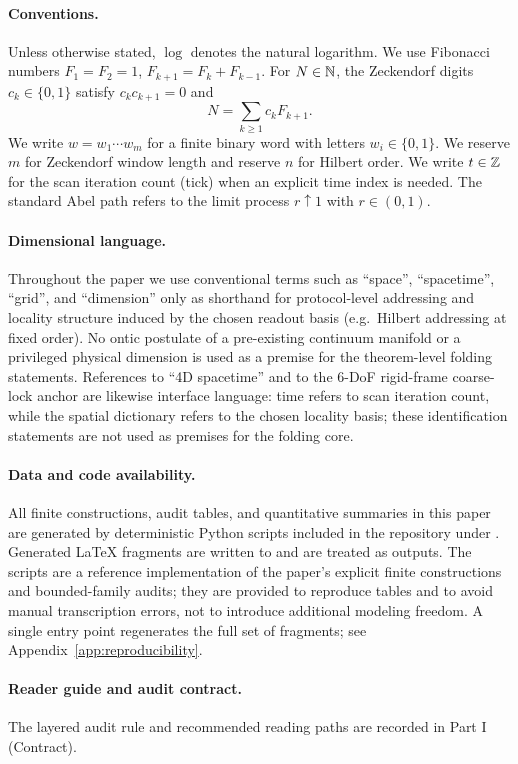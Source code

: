 \paragraph{Conventions.}
Unless otherwise stated, $\log$ denotes the natural logarithm.
We use Fibonacci numbers $F_1=F_2=1$, $F_{k+1}=F_k+F_{k-1}$.
For $N\in\mathbb{N}$, the Zeckendorf digits $c_k\in\{0,1\}$ satisfy $c_k c_{k+1}=0$ and
\[
N=\sum_{k\ge 1} c_k F_{k+1}.
\]
We write $w=w_1\cdots w_m$ for a finite binary word with letters $w_i\in\{0,1\}$.
We reserve $m$ for Zeckendorf window length and reserve $n$ for Hilbert order.
We write $t\in\mathbb{Z}$ for the scan iteration count (tick) when an explicit time index is needed.
The standard Abel path refers to the limit process $r\uparrow 1$ with $r\in(0,1)$.

\paragraph{Dimensional language.}
Throughout the paper we use conventional terms such as ``space'', ``spacetime'', ``grid'', and ``dimension'' only as shorthand for protocol-level addressing and locality structure induced by the chosen readout basis (e.g.\ Hilbert addressing at fixed order).
No ontic postulate of a pre-existing continuum manifold or a privileged physical dimension is used as a premise for the theorem-level folding statements.
References to ``4D spacetime'' and to the $6$-DoF rigid-frame coarse-lock anchor are likewise interface language: time refers to scan iteration count, while the spatial dictionary refers to the chosen locality basis; these identification statements are not used as premises for the folding core.

\paragraph{Data and code availability.}
All finite constructions, audit tables, and quantitative summaries in this paper are generated by deterministic Python scripts included in the repository under .
Generated \LaTeX{} fragments are written to  and are treated as outputs.
The scripts are a reference implementation of the paper's explicit finite constructions and bounded-family audits; they are provided to reproduce tables and to avoid manual transcription errors, not to introduce additional modeling freedom.
A single entry point  regenerates the full set of fragments; see Appendix~\ref{app:reproducibility}.

\paragraph{Reader guide and audit contract.}
The layered audit rule and recommended reading paths are recorded in Part I (Contract).

\tableofcontents
\newpage


